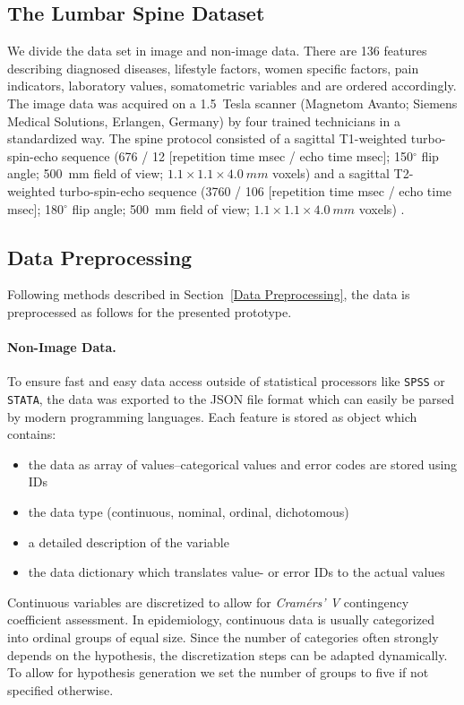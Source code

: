 \documentclass[journal]{style/vgtc} 			          %
\begin{document}
\subsection{The Lumbar Spine Dataset}
We divide the data set in image and non-image data.
%
There are 136 features describing diagnosed diseases, lifestyle factors, women specific factors, pain indicators, laboratory values, somatometric variables and are ordered accordingly.
%
The image data was acquired on a 1.5~Tesla scanner (Magnetom Avanto; Siemens Medical Solutions, Erlangen, Germany) by four trained technicians in a standardized way.
%
The spine protocol consisted of a sagittal T1-weighted turbo-spin-echo sequence (676 / 12 [repetition time msec / echo time msec]; 150$^\circ$ flip angle; 500~mm field of view; $1.1\times1.1\times4.0~mm$ voxels) and a sagittal T2-weighted turbo-spin-echo sequence (3760 / 106 [repetition time msec / echo time msec]; 180$^\circ$ flip angle; 500~mm field of view; $1.1\times1.1\times4.0~mm$ voxels) \cite{Hegenscheid2013}.

\subsection{Data Preprocessing} \label{application:Data Preprocessing}
Following methods described in Section~\ref{Data Preprocessing}, the data is preprocessed as follows for the presented prototype.
%
\paragraph{Non-Image Data.} 

To ensure fast and easy data access outside of statistical processors like \texttt{SPSS} or \texttt{STATA}, the data was exported to the JSON file format which can easily be parsed by modern programming languages.
%
Each feature is stored as object which contains: 
\begin{itemize}
	\item the data as array of values--categorical values and error codes are stored using IDs
	\item the data type (continuous, nominal, ordinal, dichotomous)
	\item a detailed description of the variable
	\item the data dictionary which translates value- or error IDs to the actual values
\end{itemize}
%
Continuous variables are discretized to allow for \emph{Cram\'{e}rs' V} contingency coefficient assessment.
%
In epidemiology, continuous data is usually categorized into ordinal groups of equal size.
%
Since the number of categories often strongly depends on the hypothesis, the discretization steps can be adapted dynamically.
%
To allow for hypothesis generation we set the number of groups to five if not specified otherwise.
\end{document}
